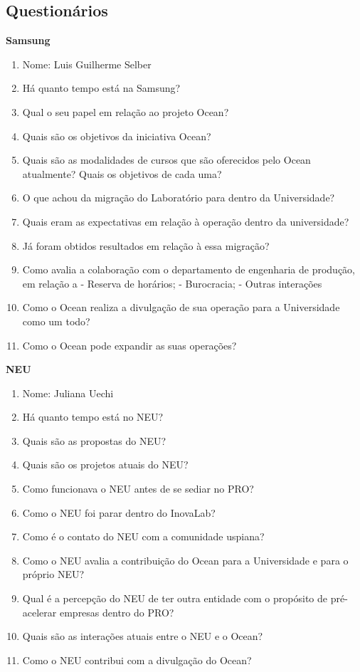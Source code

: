 \begin{apendicesenv}

\chapter{Questionários}

\textbf{Samsung}

\begin{enumerate}
\item Nome: Luis Guilherme Selber
\item Há quanto tempo está na Samsung?
\item Qual o seu papel em relação ao projeto Ocean?
\item Quais são os objetivos da iniciativa Ocean?
\item Quais são as modalidades de cursos que são oferecidos pelo Ocean atualmente? Quais os objetivos de cada uma?
\item O que achou da migração do Laboratório para dentro da Universidade?
\item Quais eram as expectativas em relação à operação dentro da universidade?
\item Já foram obtidos resultados em relação à essa migração?
\item Como avalia a colaboração com o departamento de engenharia de produção, em relação a - Reserva de horários; - Burocracia; - Outras interações
\item Como o Ocean realiza a divulgação de sua operação para a Universidade como um todo?
\item Como o Ocean pode expandir as suas operações?
\end{enumerate}

\clearpage

\textbf{NEU}

\begin{enumerate}
\item Nome: Juliana Uechi
\item Há quanto tempo está no NEU?
\item Quais são as propostas do NEU?
\item Quais são os projetos atuais do NEU?
\item Como funcionava o NEU antes de se sediar no PRO?
\item Como o NEU foi parar dentro do InovaLab?
\item Como é o contato do NEU com a comunidade uspiana?
\item Como o NEU avalia a contribuição do Ocean para a Universidade e para o próprio NEU?
\item Qual é a percepção do NEU de ter outra entidade com o propósito de pré-acelerar empresas dentro do PRO?
\item Quais são as interações atuais entre o NEU e o Ocean?
\item Como o NEU contribui com a divulgação do Ocean?
\end{enumerate}


\end{apendicesenv}
